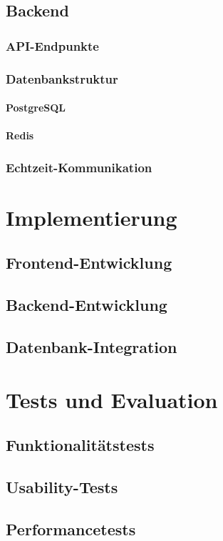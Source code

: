 \documentclass[a4paper,12pt]{report}
\begin{document}
    \section{Backend}
        \subsection{API-Endpunkte}
        \subsection{Datenbankstruktur}
        		\subsubsection{PostgreSQL}
        		\subsubsection{Redis}
        \subsection{Echtzeit-Kommunikation}

\chapter{Implementierung}
    \section{Frontend-Entwicklung}
    \section{Backend-Entwicklung}
    \section{Datenbank-Integration}

\chapter{Tests und Evaluation}
    \section{Funktionalitätstests}
    \section{Usability-Tests}
    \section{Performancetests}
\end{document}
